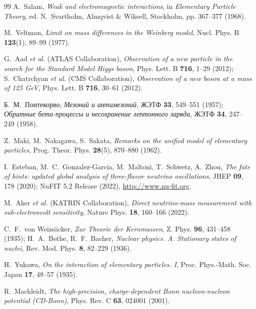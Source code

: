 \documentclass[12pt,a4paper]{article}
\theoremstyle{definition}
\theoremstyle{remark}
\begin{document}
\begin{thebibliography}{99}
	A.~Salam, \textit{Weak and electromagnetic interactions}, in \textit{Elementary Particle Theory}, ed. N.~Svartholm, Almqvist \& Wiksell, Stockholm, pp. 367--377 (1968).
	
	M.~Veltman, \textit{Limit on mass differences in the Weinberg model}, Nucl. Phys. B \textbf{123}(1), 89--99 (1977).
	
	G.~Aad \textit{et al.} (ATLAS Collaboration), \textit{Observation of a new particle in the search for the Standard Model Higgs boson}, Phys. Lett. B \textbf{716}, 1--29 (2012); S.~Chatrchyan \textit{et al.} (CMS Collaboration), \textit{Observation of a new boson at a mass of 125 GeV}, Phys. Lett. B \textbf{716}, 30--61 (2012).
	
	Б.~М.~Понтекорво, \textit{Мезоний и антимезоний}, ЖЭТФ \textbf{33}, 549--551 (1957); \textit{Обратные бета-процессы и несохранение лептонного заряда}, ЖЭТФ \textbf{34}, 247--249 (1958).
	
	Z.~Maki, M.~Nakagawa, S.~Sakata, \textit{Remarks on the unified model of elementary particles}, Prog. Theor. Phys. \textbf{28}(5), 870--880 (1962).
	
	I.~Esteban, M.~C.~Gonzalez-Garcia, M.~Maltoni, T.~Schwetz, A.~Zhou, \textit{The fate of hints: updated global analysis of three-flavor neutrino oscillations}, JHEP \textbf{09}, 178 (2020); NuFIT 5.2 Release (2022), \url{http://www.nu-fit.org}.
	
	M.~Aker \textit{et al.} (KATRIN Collaboration), \textit{Direct neutrino-mass measurement with sub-electronvolt sensitivity}, Nature Phys. \textbf{18}, 160--166 (2022).
	
	C.~F.~von Weizs\"acker, \textit{Zur Theorie der Kernmassen}, Z. Phys. \textbf{96}, 431--458 (1935); H.~A.~Bethe, R.~F.~Bacher, \textit{Nuclear physics. A. Stationary states of nuclei}, Rev. Mod. Phys. \textbf{8}, 82--229 (1936).
	
	H.~Yukawa, \textit{On the interaction of elementary particles. I}, Proc. Phys.-Math. Soc. Japan \textbf{17}, 48--57 (1935).
	
	R.~Machleidt, \textit{The high-precision, charge-dependent Bonn nucleon-nucleon potential (CD-Bonn)}, Phys. Rev. C \textbf{63}, 024001 (2001).
	

\end{thebibliography}
\end{document}
